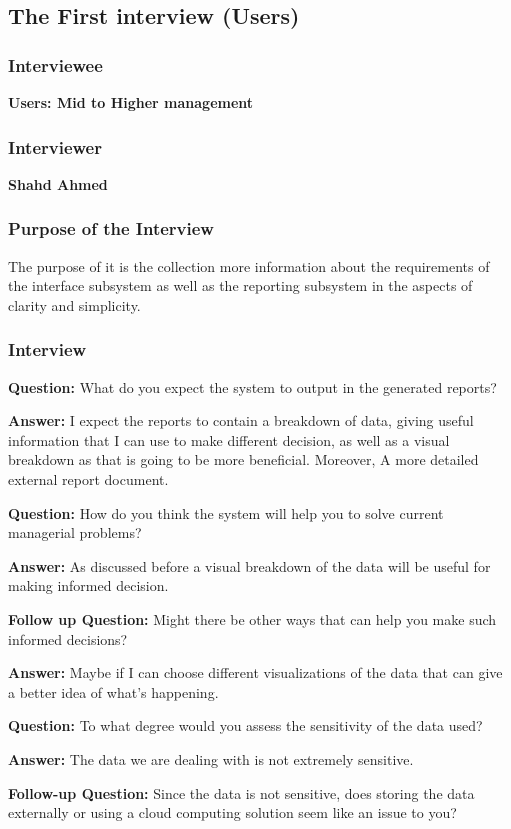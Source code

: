 \documentclass{article}
\begin{document}
\subsection{The First interview (Users)}
\subsubsection{Interviewee}
\textbf{Users: Mid to Higher management}
\subsubsection{Interviewer}
\textbf{Shahd Ahmed}
\subsubsection{Purpose of the Interview}
The purpose of it is the collection more information about the requirements of the interface subsystem as well as the reporting subsystem in the aspects of clarity and simplicity.
\subsubsection{Interview}

\textbf{Question:} What do you expect the system to output in the generated reports?

\textbf{Answer:} I expect the reports to contain a breakdown of data, giving useful information that I can use to make different decision, as well as a visual breakdown as that is going to be more beneficial. Moreover, A more detailed external report document.

\textbf{Question:} How do you think the system will help you to solve current managerial problems?

\textbf{Answer:} As discussed before a visual breakdown of the data will be useful for making informed decision.

\textbf{Follow up Question:} Might there be other ways that can help you make such informed decisions?

\textbf{Answer:} Maybe if I can choose different visualizations of the data that can give a better idea of what's happening.

\textbf{Question:} To what degree would you assess the sensitivity of the data used?

\textbf{Answer:} The data we are dealing with is not extremely sensitive.

\textbf{Follow-up Question:} Since the data is not sensitive, does storing the data externally or using a cloud computing solution seem like an issue to you?
\end{document}
